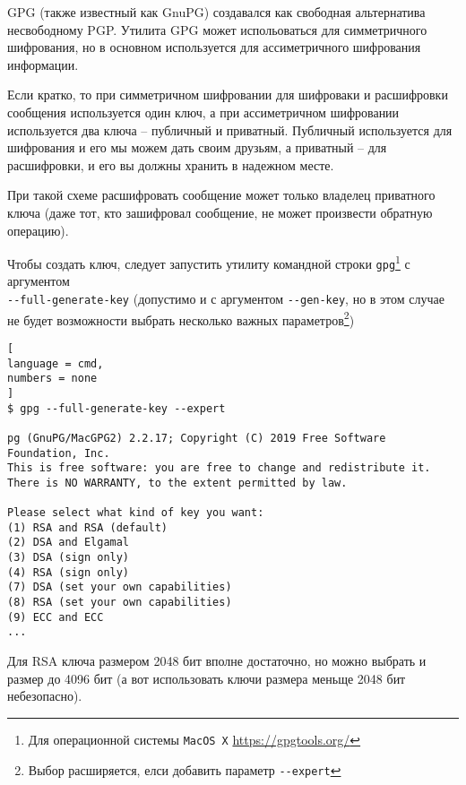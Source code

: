 \documentclass[%
	11pt,
	a4paper,
	utf8,
		]{article}
\begin{document}
GPG (также известный как GnuPG) создавался как свободная альтернатива несвободному PGP. Утилита GPG может испольоваться для симметричного шифрования, но в основном используется для ассиметричного шифрования информации.

Если кратко, то при симметричном шифровании для шифроваки и расшифровки сообщения используется один ключ, а при ассиметричном шифровании используется два ключа -- публичный и приватный. Публичный используется для шифрования и его мы можем дать своим друзьям, а приватный -- для расшифровки, и его вы должны хранить в надежном месте.

При такой схеме расшифровать сообщение может только владелец приватного ключа (даже тот, кто зашифровал сообщение, не может произвести обратную операцию).


Чтобы создать ключ, следует запустить утилиту командной строки \texttt{gpg}\footnote{Для операционной системы \texttt{MacOS X} \url{https://gpgtools.org/}} с аргументом \\\mbox{\lstinline{--full-generate-key}} (допустимо и с аргументом \lstinline{--gen-key}, но в этом случае не будет возможности выбрать несколько важных параметров\footnote{Выбор расширяется, елси добавить параметр \lstinline{--expert}})

\begin{lstlisting}[
language = cmd,
numbers = none
]
$ gpg --full-generate-key --expert

pg (GnuPG/MacGPG2) 2.2.17; Copyright (C) 2019 Free Software Foundation, Inc.
This is free software: you are free to change and redistribute it.
There is NO WARRANTY, to the extent permitted by law.

Please select what kind of key you want:
(1) RSA and RSA (default)
(2) DSA and Elgamal
(3) DSA (sign only)
(4) RSA (sign only)
(7) DSA (set your own capabilities)
(8) RSA (set your own capabilities)
(9) ECC and ECC
...
\end{lstlisting}


Для RSA ключа размером 2048 бит вполне достаточно, но можно выбрать и размер до 4096 бит (а вот использовать ключи размера меньще 2048 бит небезопасно).
\end{document}
